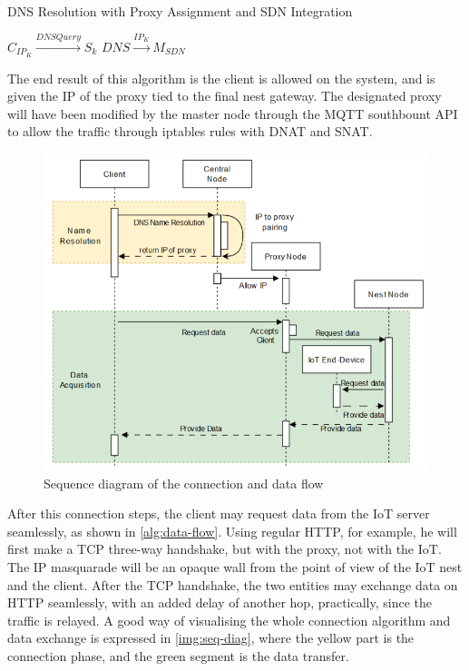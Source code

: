 \begin{algorithm}[ht]
    \caption{DNS Resolution with Proxy Assignment and SDN Integration}
    \label{alg:dns-resolution}
    \LinesNotNumbered      %
    \vspace{6pt}
    $C_{IP_K} \xrightarrow{DNS Query} S_k$\;
    \vspace{2pt}
    $DNS \xrightarrow{IP_K} M_{SDN}$\;
    \vspace{2pt}
\end{algorithm}

The end result of this algorithm is the client is allowed on the system, and is given the IP of the proxy tied to the final nest gateway. The designated proxy will have been modified by the master node through the MQTT southbount API to allow the traffic through iptables rules with DNAT and SNAT.

\begin{figure}
    \centering
    \includegraphics[width=0.7\linewidth]{images/sequence_diagram.png}
    \caption{Sequence diagram of the connection and data flow}
    \label{img:seq-diag}
\end{figure}

After this connection steps, the client may request data from the IoT server seamlessly, as shown in \autoref{alg:data-flow}\cite{vladescu2025}. Using regular HTTP, for example, he will first make a TCP three-way handshake, but with the proxy, not with the IoT. The IP masquarade will be an opaque wall from the point of view of the IoT nest and the client. After the TCP handshake, the two entities may exchange data on HTTP seamlessly, with an added delay of another hop, practically, since the traffic is relayed. A good way of visualising the whole connection algorithm and data exchange is expressed in \autoref{img:seq-diag}\cite{vladescu2025}, where the yellow part is the connection phase, and the green segment is the data transfer.

